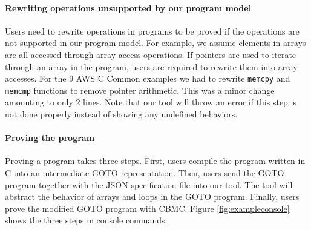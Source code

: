 
\paragraph{Rewriting operations unsupported by our program model} 
Users need to rewrite operations in programs to be proved if the
operations are not supported in our program model. For example, we
assume elements in arrays are all accessed through array access
operations. If pointers are used to iterate through an array in the
program, users are required to rewrite them into array accesses. For
the 9 AWS C Common examples we had to rewrite {\tt memcpy} and {\tt
  memcmp} functions to remove pointer arithmetic. This was a minor
change amounting to only 2 lines. Note that our tool will throw an
error if this step is not done properly instead of showing any
undefined behaviors.

\paragraph{Proving the program}
Proving a program takes three steps. First, users compile the program 
written in C into an intermediate GOTO representation. Then, users send 
the GOTO program together with the JSON specification file into our tool. 
The tool will abstract the behavior of arrays and loops in the GOTO program. 
Finally, users prove the modified GOTO program with CBMC. Figure 
\ref{fig:exampleconsole} shows the three steps in console commands.

